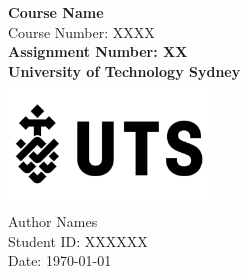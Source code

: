 \documentclass[12pt]{article}
\begin{document}
\begin{titlepage}
    \centering
    \vspace*{1cm}
    \Huge
    \textbf{Course Name}\\
    \vspace{0.5cm}
    \LARGE
    Course Number: XXXX\\
    \vspace{1.5cm}
    \textbf{Assignment Number: XX}\\
    \vspace{2cm}
    \textbf{University of Technology Sydney}\\
    \vfill
    \includegraphics[width=0.4\textwidth]{assets/images/uts-logo.png}\\
    \vfill
    \Large
    Author Names\\
    Student ID: XXXXXX\\
    Date: \today
\end{titlepage}

\tableofcontents
\newpage






\end{document}
